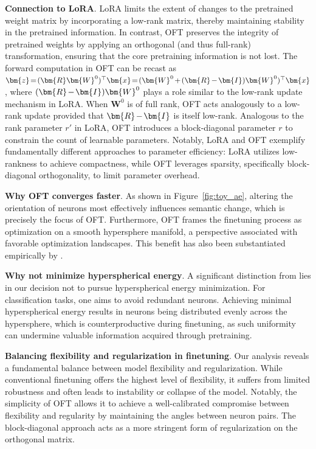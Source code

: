 \textbf{Connection to LoRA}. LoRA limits the extent of changes to the pretrained weight matrix by incorporating a low-rank matrix, thereby maintaining stability in the pretrained information. In contrast, OFT preserves the integrity of pretrained weights by applying an orthogonal (and thus full-rank) transformation, ensuring that the core pretraining information is not lost. The forward computation in OFT can be recast as $\thickmuskip=2mu \medmuskip=2mu \bm{z}=(\bm{R}\bm{W}^0)^\top\bm{x}=(\bm{W}^0+(\bm{R}-\bm{I})\bm{W}^0)^\top\bm{x}$, where $\thickmuskip=2mu \medmuskip=2mu (\bm{R}-\bm{I})\bm{W}^0$ plays a role similar to the low-rank update mechanism in LoRA. When $\bm{W}^0$ is of full rank, OFT acts analogously to a low-rank update provided that $\thickmuskip=2mu \medmuskip=2mu \bm{R}-\bm{I}$ is itself low-rank. Analogous to the rank parameter $r'$ in LoRA, OFT introduces a block-diagonal parameter $r$ to constrain the count of learnable parameters. Notably, LoRA and OFT exemplify fundamentally different approaches to parameter efficiency: LoRA utilizes low-rankness to achieve compactness, while OFT leverages sparsity, specifically block-diagonal orthogonality, to limit parameter overhead.

\textbf{Why OFT converges faster}. As shown in Figure~\ref{fig:toy_ae}, altering the orientation of neurons most effectively influences semantic change, which is precisely the focus of OFT. Furthermore, OFT frames the finetuning process as optimization on a smooth hypersphere manifold, a perspective associated with favorable optimization landscapes. This benefit has also been substantiated empirically by \cite{liu2021orthogonal}.

\textbf{Why not minimize hyperspherical energy}. A significant distinction from \cite{liu2021orthogonal} lies in our decision not to pursue hyperspherical energy minimization. For classification tasks, one aims to avoid redundant neurons. Achieving minimal hyperspherical energy results in neurons being distributed evenly across the hypersphere, which is counterproductive during finetuning, as such uniformity can undermine valuable information acquired through pretraining.

\textbf{Balancing flexibility and regularization in finetuning}. Our analysis reveals a fundamental balance between model flexibility and regularization. While conventional finetuning offers the highest level of flexibility, it suffers from limited robustness and often leads to instability or collapse of the model. Notably, the simplicity of OFT allows it to achieve a well-calibrated compromise between flexibility and regularity by maintaining the angles between neuron pairs. The block-diagonal approach acts as a more stringent form of regularization on the orthogonal matrix.

